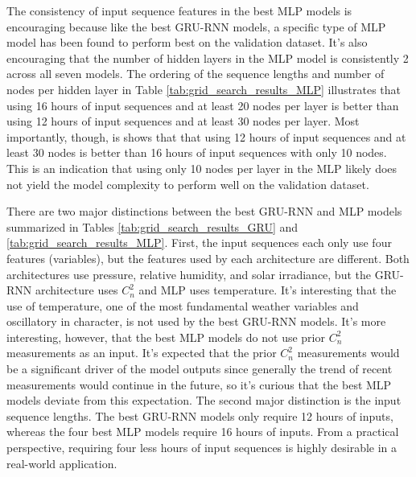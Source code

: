 The consistency of input sequence features in the best \ac{MLP} models is encouraging because like the best \ac{GRU-RNN} models, a specific type of \ac{MLP} model has been found to perform best on the validation dataset. It's also encouraging that the number of hidden layers in the \ac{MLP} model is consistently 2 across all seven models. The ordering of the sequence lengths and number of nodes per hidden layer in Table \ref{tab:grid_search_results_MLP} illustrates that using 16 hours of input sequences and at least 20 nodes per layer is better than using 12 hours of input sequences and at least 30 nodes per layer. Most importantly, though, is shows that that using 12 hours of input sequences and at least 30 nodes is better than 16 hours of input sequences with only 10 nodes. This is an indication that using only 10 nodes per layer in the \ac{MLP} likely does not yield the model complexity to perform well on the validation dataset.

There are two major distinctions between the best \ac{GRU-RNN} and \ac{MLP} models summarized in Tables \ref{tab:grid_search_results_GRU} and \ref{tab:grid_search_results_MLP}. First, the input sequences each only use four features (variables), but the features used by each architecture are different. Both architectures use pressure, relative humidity, and solar irradiance, but the \ac{GRU-RNN} architecture uses $C_{n}^{2}$ and \ac{MLP} uses temperature. It's interesting that the use of temperature, one of the most fundamental weather variables and oscillatory in character, is not used by the best \ac{GRU-RNN} models. It's more interesting, however, that the best \ac{MLP} models do not use prior $C_{n}^{2}$ measurements as an input. It's expected that the prior $C_{n}^{2}$ measurements would be a significant driver of the model outputs since generally the trend of recent measurements would continue in the future, so it's curious that the best \ac{MLP} models deviate from this expectation. The second major distinction is the input sequence lengths. The best \ac{GRU-RNN} models only require 12 hours of inputs, whereas the four best \ac{MLP} models require 16 hours of inputs. From a practical perspective, requiring four less hours of input sequences is highly desirable in a real-world application.

